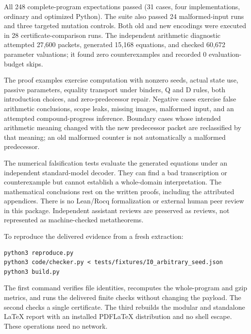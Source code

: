 \documentclass[11pt,letterpaper]{article}
\theoremstyle{definition}\newtheorem{definition}[theorem]{Definition}
\theoremstyle{remark}\newtheorem{remark}[theorem]{Remark}
\begin{document}
All 248 complete-program expectations passed (31 cases, four implementations, ordinary and optimized Python). The suite also passed 24 malformed-input runs and three targeted mutation controls. Both old and new encodings were executed in 28 certificate-comparison runs. The independent arithmetic diagnostic attempted 27,600 packets, generated 15,168 equations, and checked 60,672 parameter valuations; it found zero counterexamples and recorded 0 evaluation-budget skips.



The proof examples exercise computation with nonzero seeds, actual state
use, passive parameters, equality transport under binders, Q and D rules,
both introduction choices, and zero-predecessor repair. Negative cases
exercise false arithmetic conclusions, scope leaks, missing images,
malformed input, and an attempted compound-progress inference.
Boundary cases whose intended arithmetic meaning changed with the new
predecessor packet are reclassified by that meaning; an old malformed
counter is not automatically a malformed predecessor.

The numerical falsification tests evaluate the generated equations under
an independent standard-model decoder. They can find a bad transcription
or counterexample but cannot establish a whole-domain interpretation.
The mathematical conclusions rest on the written proofs, including the
attributed appendices. There is no Lean/Rocq formalization or external
human peer review in this package. Independent assistant reviews are
preserved as reviews, not represented as machine-checked metatheorems.

To reproduce the delivered evidence from a fresh extraction:
\begin{lstlisting}
python3 reproduce.py
python3 code/checker.py < tests/fixtures/I0_arbitrary_seed.json
python3 build.py
\end{lstlisting}
The first command verifies file identities, recomputes the whole-program
and gzip metrics, and runs the delivered finite checks without changing
the payload. The second checks a single certificate. The third rebuilds
the modular and standalone LaTeX report with an installed PDFLaTeX
distribution and no shell escape. These operations need no network.


\end{document}
